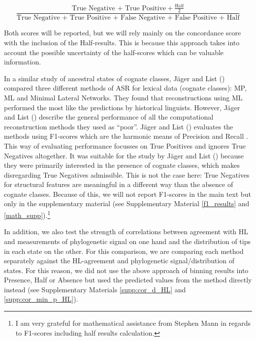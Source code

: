 \documentclass[12pt,letterpaper]{article}
\begin{document}
\begin{equation}\label{eq:accuracy_incl_half}
\frac{\text{True Negative + True Positive} + \frac{\text{Half}}{2}}{\text{True Negative + True Positive + False Negative + False Positive + Half}}
\end{equation}

Both scores will be reported, but we will rely mainly on the concordance score with the inclusion of the Half-results. This is because this approach takes into account the possible uncertainty of the half-scores which can be valuable information.

In a similar study of ancestral states of cognate classes, J\"ager and List (\citeyear{jager2018using}) compared three different methods of ASR for lexical data (cognate classes): MP, ML and Minimal Lateral Networks. They found that reconstructions using ML performed the most like the predictions by historical linguists. However, J\"ager and List (\citeyear{jager2018using}) describe the general performance of all the computational reconstruction methods they used as ``poor''. J\"ager and List (\citeyear{jager2018using}) evaluates the methods using F1-scores which are the harmonic means of Precision and Recall \citep{sasaki2007truth}. This way of evaluating performance focusses on True Positives and ignores True Negatives altogether. It was suitable for the study by J\"ager and List (\citeyear{jager2018using}) because they were primarily interested in the presence of cognate classes, which makes disregarding True Negatives admissible. This is not the case here: True Negatives for structural features are meaningful in a different way than the absence of cognate classes. Because of this, we will not report F1-scores in the main text but only in the supplementary material (see Supplementary Material \ref{f1_results} and \ref{math_supp}).\footnote{I am very grateful for mathematical assistance from Stephen Mann in regards to F1-scores including half results calculation.} %

 
In addition, we also test the strength of correlations between agreement with HL and measurements of phylogenetic signal on one hand and the distribution of tips in each state on the other. For this comparison, we are comparing each method separately against the HL-agreement and phylogenetic signal/distribution of states. For this reason, we did not use the above approach of binning results into Presence, Half or Absence but used the predicted values from the method directly instead (see Supplementary Materials \ref{supp:cor_d_HL} and \ref{supp:cor_min_p_HL}).
\end{document}
